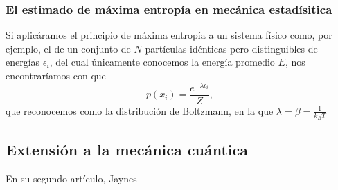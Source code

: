 \subsubsection{El estimado de máxima entropía en mecánica estadísitica}

Si aplicáramos el principio de máxima entropía a un sistema físico como, por ejemplo, el de un conjunto de $N$ partículas idénticas pero distinguibles de energías $\epsilon_{i}$, del cual únicamente conocemos la energía promedio $E$, nos encontraríamos con que
\begin{equation}\label{eq:Boltzman}
    p(x_{i})=\frac{e^{-\lambda\epsilon_{i}}}{Z},
\end{equation}
que reconocemos como la distribución de Boltzmann, en la que $\lambda=\beta=\frac{1}{k_{B}T}$
\subsection{Extensión a la mecánica cuántica}

En su segundo artículo, Jaynes

\newpage